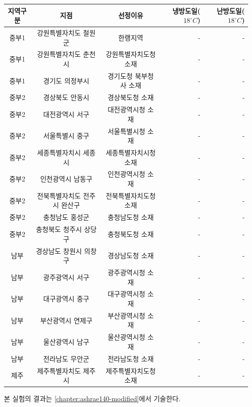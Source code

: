 \begin{defaulttable}
  \caption{기상데이터 선택 지점}
  \label{table:weatherdata-points}

  \begin{tabular}{c c c r r}
    \toprule
    \textbf{지역구분} & \textbf{지점} & \textbf{선정이유} & \textbf{냉방도일($18^\circ C$)} & \textbf{난방도일($18^\circ C$)} \\
    \midrule
    중부1 & 강원특별자치도 철원군 & 한랭지역 & - & - \\
    중부1 & 강원특별자치도 춘천시 & 강원특별자치도청 소재 & - & - \\
    중부1 & 경기도 의정부시 & 경기도청 북부청사 소재 & - & - \\
    \midrule
    중부2 & 경상북도 안동시 & 경상북도청 소재 & - & - \\
    중부2 & 대전광역시 서구 & 대전광역시청 소재 & - & - \\
    중부2 & 서울특별시 중구 & 서울특별시청 소재 & - & - \\
    중부2 & 세종특별자치시 세종시 & 세종특별자치시청 소재 & - & - \\
    중부2 & 인천광역시 남동구 & 인천광역시청 소재 & - & - \\
    중부2 & 전북특별자치도 전주시 완산구 & 전북특별자치도청 소재 & - & - \\
    중부2 & 충청남도 홍성군 & 충청남도청 소재 & - & - \\
    중부2 & 충청북도 청주시 상당구 & 충청북도청 소재 & - & - \\
    \midrule
    남부 & 경상남도 창원시 의창구 & 경상남도청 소재 & - & - \\
    남부 & 광주광역시 서구 & 광주광역시청 소재 & - & - \\
    남부 & 대구광역시 중구 & 대구광역시청 소재 & - & - \\
    남부 & 부산광역시 연제구 & 부산광역시청 소재 & - & - \\
    남부 & 울산광역시 남구 & 울산광역시청 소재 & - & - \\
    남부 & 전라남도 무안군 & 전라남도청 소재 & - & - \\
    \midrule
    제주 & 제주특별자치도 제주시 & 제주특별자치도청 소재 & - & - \\
    \bottomrule

  \end{tabular}
\end{defaulttable}

본 실험의 결과는 \cref{chapter:ashrae140-modified}에서 기술한다.

